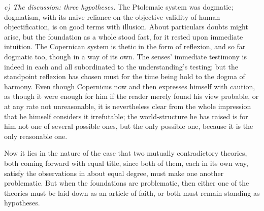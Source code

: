 \documentclass[12pt,a4paper]{book}
\newcommand{\runin}[1]{\emph{#1}\hspace{0.4em}}
\begin{document}
\runin{c) The discussion: three hypotheses.} The Ptolemaic system was dogmatic; dogmatism, with its
naive reliance
on the objective validity of human objectification, is on good terms with illusion. About particulars
doubts might arise, but the foundation as a whole stood fast, for it rested upon immediate intuition. The
Copernican system is thetic in the form of reflexion, and so far dogmatic too, though in a way of its own.
The senses' immediate testimony is indeed in each and all subordinated to the understanding's testing; but
the standpoint reflexion has chosen must for the time being hold to the dogma of harmony. Even though
Copernicus now and then expresses himself with caution, as though it were enough for him if the reader
merely found his view probable, or at any rate not unreasonable, it is nevertheless clear from the whole
impression that he himself considers it irrefutable; the world-structure he has raised is for him not one
of several possible ones, but the only possible one, because it is the only reasonable one.

Now it lies in the nature of the case that two mutually contradictory theories, both coming forward with
equal title, since both of them, each in its own way, satisfy the observations in about equal degree, must
make one another problematic. But when the foundations are problematic, then either one of the theories
must be laid down as an article of faith, or both must remain standing as hypotheses.
\end{document}

